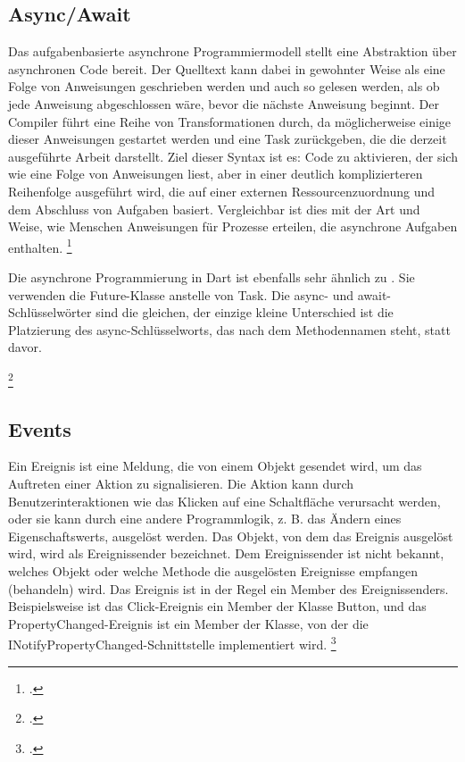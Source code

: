 \subsection{Async/Await}
Das aufgabenbasierte asynchrone Programmiermodell stellt eine Abstraktion über asynchronen Code bereit. Der Quelltext kann dabei in gewohnter Weise als eine Folge von Anweisungen geschrieben werden und auch so gelesen werden, als ob jede Anweisung abgeschlossen wäre, bevor die nächste Anweisung beginnt. Der Compiler führt eine Reihe von Transformationen durch, da möglicherweise einige dieser Anweisungen gestartet werden und eine Task zurückgeben, die die derzeit ausgeführte Arbeit darstellt.
Ziel dieser Syntax ist es: Code zu aktivieren, der sich wie eine Folge von Anweisungen liest, aber in einer deutlich komplizierteren Reihenfolge ausgeführt wird, die auf einer externen Ressourcenzuordnung und dem Abschluss von Aufgaben basiert. Vergleichbar ist dies mit der Art und Weise, wie Menschen Anweisungen für Prozesse erteilen, die asynchrone Aufgaben enthalten.  \footcite[Vgl. MICROSFT Async await][Abgerufen am \today]{GoogleFlutterSharedPreferences2020} 

Die asynchrone Programmierung in Dart ist ebenfalls sehr ähnlich zu \Csharp. Sie verwenden die Future-Klasse anstelle von Task. Die async- und await-Schlüsselwörter sind die gleichen, der einzige kleine Unterschied ist die Platzierung des async-Schlüsselworts, das nach dem Methodennamen steht, statt davor.

\begin{minipage}{\linewidth}

\end{minipage}
\footcitetext[In Anlehnung an ][Abgerufen am \today]{Pedley2019}


\subsection{Events}
Ein Ereignis ist eine Meldung, die von einem Objekt gesendet wird, um das Auftreten einer Aktion zu signalisieren. Die Aktion kann durch Benutzerinteraktionen wie das Klicken auf eine Schaltfläche verursacht werden, oder sie kann durch eine andere Programmlogik, z. B. das Ändern eines Eigenschaftswerts, ausgelöst werden. Das Objekt, von dem das Ereignis ausgelöst wird, wird als Ereignissender bezeichnet. Dem Ereignissender ist nicht bekannt, welches Objekt oder welche Methode die ausgelösten Ereignisse empfangen (behandeln) wird. Das Ereignis ist in der Regel ein Member des Ereignissenders. Beispielsweise ist das Click-Ereignis ein Member der Klasse Button, und das PropertyChanged-Ereignis ist ein Member der Klasse, von der die INotifyPropertyChanged-Schnittstelle implementiert wird. \footcite[Vgl. MICROSFT Events][Abgerufen am \today]{GoogleFlutterSharedPreferences2020} 

